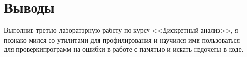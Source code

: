 \section{Выводы}
Выполнив третью лабораторную работу по курсу <<Дискретный анализ>>, я познако-мился со утилитами для профилирования и научился ими пользоваться для проверкипрограмм на ошибки в работе с памятью и искать недочеты в коде.
\pagebreak
